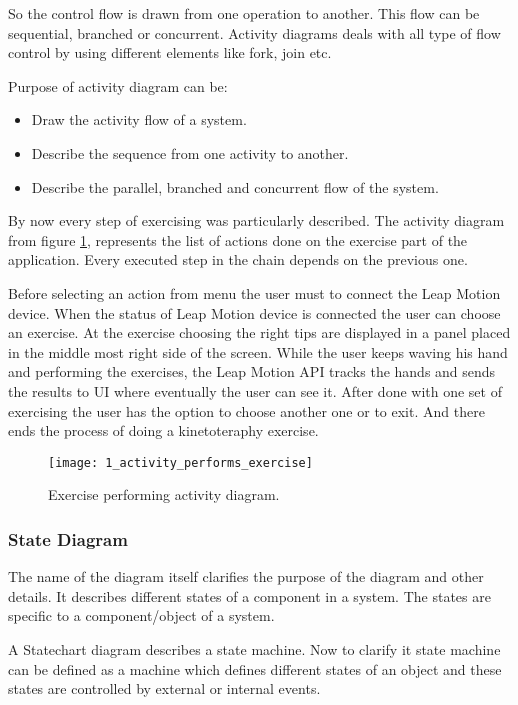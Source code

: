 So the control flow is drawn from one operation to another. This flow can be sequential, branched or concurrent. Activity diagrams deals with all type of flow control by using different elements like fork, join etc.


Purpose of activity diagram can be:
\begin{itemize}
\item Draw the activity flow of a system.
\item Describe the sequence from one activity to another.
\item Describe the parallel, branched and concurrent flow of the system.
\end{itemize}
\vspace{0.2cm}

By now every step of exercising was particularly described.
The activity diagram from  \mbox{figure} \ref{activity_performs}, represents the list of actions done on the exercise part of the application. Every executed step in the chain  depends on the previous one.

Before selecting an action from menu the user must to connect the Leap Motion device. When the status of Leap Motion device is connected the user can choose an exercise. At the exercise choosing the right tips are displayed in a panel placed in the middle most right side of the screen. While the user keeps waving his hand and performing the exercises, the Leap Motion API tracks the hands and sends the results to UI where eventually the user can see it. After done with one set of exercising the user has the option to choose another one or to exit. And there ends the process of doing a kinetoteraphy exercise.
\begin{figure}[!h]
\centering
\texttt{[image: 1\_activity\_performs\_exercise]}
\caption{Exercise performing activity diagram.}\label{activity_performs}
\end{figure}

\clearpage

\subsubsection{State Diagram}
The name of the diagram itself clarifies the purpose of the diagram and other details. It describes different states of a component in a system. The states are specific to a component/object of a system.

A Statechart diagram describes a state machine. Now to clarify it state machine can be defined as a machine which defines different states of an object and these states are controlled by external or internal events.

